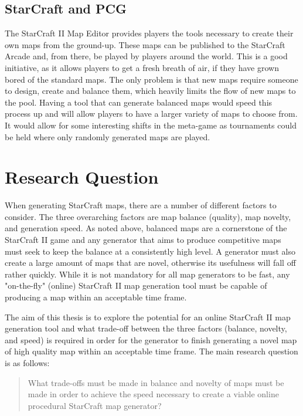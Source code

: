 
\subsection{StarCraft and PCG}
\label{introduction_starcraft_pcg}

The StarCraft II Map Editor provides players the tools necessary to create their own maps from the ground-up. These maps can be published to the StarCraft Arcade\cite{starcraftarcade} and, from there, be played by players around the world. This is a good initiative, as it allows players to get a fresh breath of air, if they have grown bored of the standard maps. The only problem is that new maps require someone to design, create and balance them, which heavily limits the flow of new maps to the pool. Having a tool that can generate balanced maps would speed this process up and will allow players to have a larger variety of maps to choose from. It would allow for some interesting shifts in the meta-game as tournaments could be held where only randomly generated maps are played. 

\section{Research Question}
\label{introduction_researchquestion}
When generating StarCraft maps, there are a number of different factors to consider. The three overarching factors are map balance (quality), map novelty, and generation speed. As noted above, balanced maps are a cornerstone of the StarCraft II game and any generator that aims to produce competitive maps must seek to keep the balance at a consistently high level. A generator must also create a large amount of maps that are novel, otherwise its usefulness will fall off rather quickly. While it is not mandatory for all map generators to be fast, any "on-the-fly" (online) StarCraft II map generation tool must be capable of producing a map within an acceptable time frame.

The aim of this thesis is to explore the potential for an online StarCraft II map generation tool and what trade-off between the three factors (balance, novelty, and speed) is required in order for the generator to finish generating a novel map of high quality map within an acceptable time frame. The main research question is as follows:
\begin{quote}
What trade-offs must be made in balance and novelty of maps must be made in order to achieve the speed necessary to create a viable online procedural StarCraft map generator?
\end{quote}

